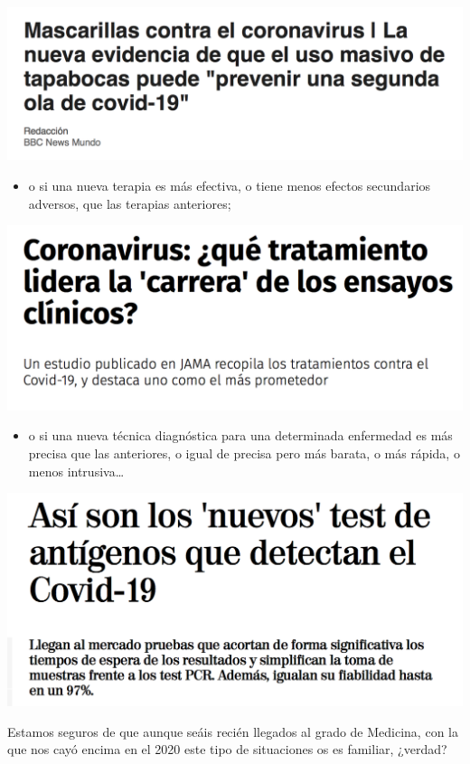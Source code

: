 \documentclass[
]{book}
\providecommand{\tightlist}{%
  \setlength{\itemsep}{0pt}\setlength{\parskip}{0pt}}
\theoremstyle{definition}
\theoremstyle{definition}
\theoremstyle{definition}
\theoremstyle{definition}
\theoremstyle{remark}
\begin{document}
\begin{center}\includegraphics[width=0.6\linewidth]{INREMDN_files/figure-html/covidintro5} \end{center}

\begin{itemize}
\tightlist
\item
  o si una nueva terapia es más efectiva, o tiene menos efectos secundarios adversos, que las terapias anteriores;
\end{itemize}

\begin{center}\includegraphics[width=0.6\linewidth]{INREMDN_files/figure-html/covidintro3} \end{center}

\begin{itemize}
\tightlist
\item
  o si una nueva técnica diagnóstica para una determinada enfermedad es más precisa que las anteriores, o igual de precisa pero más barata, o más rápida, o menos intrusiva\ldots{}
\end{itemize}

\begin{center}\includegraphics[width=0.6\linewidth]{INREMDN_files/figure-html/covidintro4} \end{center}

Estamos seguros de que aunque seáis recién llegados al grado de Medicina, con la que nos cayó encima en el 2020 este tipo de situaciones os es familiar, ¿verdad?
\end{document}

